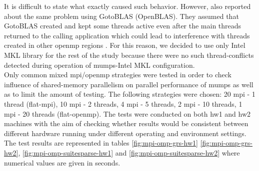 It is difficult to state what exactly caused such behavior. However, \citeauthor{chowdhury2010some} also reported about the same problem using GotoBLAS (OpenBLAS). They assumed that GotoBLAS created and kept some threads active even after the main threads returned to the calling application which could lead to interference with threads created in other \gls{openmp} regions \cite{chowdhury2010some}. For this reason, we decided to use only Intel MKL library for the rest of the study because there were no such thread-conflicts detected during operation of \gls{mumps}-Intel MKL configuration.\\


Only common mixed \gls{mpi}/\gls{openmp} strategies were tested in order to check influence of shared-memory parallelism on parallel performance of \gls{mumps} as well as to limit the amount of testing. The following strategies were chosen: 20 \gls{mpi} - 1 thread (flat-\gls{mpi}), 10 \gls{mpi} - 2 threads, 4 \gls{mpi} - 5 threads, 2 \gls{mpi} - 10 threads, 1 \gls{mpi} - 20 threads (flat-\gls{openmp}). The tests were conducted on both \gls{hw1} and \gls{hw2} machines with the aim of checking whether  results would be consistent between different hardware running under different operating and environment settings. The test results are represented in tables \ref{fig:mpi-omp-grs-hw1} \ref{fig:mpi-omp-grs-hw2}, \ref{fig:mpi-omp-suitesparse-hw1} and \ref{fig:mpi-omp-suitesparse-hw2} where numerical values are given in seconds.\\


